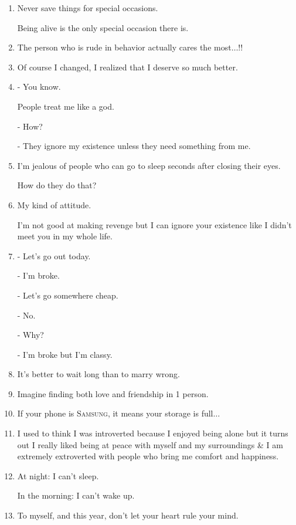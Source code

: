 \documentclass{article}
\numberwithin{equation}{section}
\begin{document}
\begin{enumerate}
    \textbf{Inner peace} is the new success.
    
    \textbf{Health} is the new wealth.
    
    \textbf{Kindness} is the new cool.
    \item Never save things for special occasions.
    
    Being alive is the only special occasion there is.
    \item The person who is rude in behavior actually cares the most$\ldots$!!
    \item Of course I changed, I realized that I deserve so much better.
    \item - You know.
    
    People treat me like a god.
    
    - How?
    
    - They ignore my existence unless they need something from me.
    \item I'm jealous of people who can go to sleep seconds after closing their eyes.
    
    How do they do that?
    \item My kind of attitude.
    
    I'm not good at making revenge but I can ignore your existence like I didn't meet you in my whole life.
    \item - Let's go out today.
    
    - I'm broke.
    
    - Let's go somewhere cheap.
    
    - No.
    
    - Why?
    
    - I'm broke but I'm classy.
    \item It's better to wait long than to marry wrong.
    \item Imagine finding both love and friendship in 1 person.
    \item If your phone is \textsc{Samsung}, it means your storage is full$\ldots$
    \item I used to think I was introverted because I enjoyed being alone but it turns out I really liked being at peace with myself and my surroundings \& I am extremely extroverted with people who bring me comfort and happiness.
    \item At night: I can't sleep.
    
    In the morning: I can't wake up.
    \item To myself, and this year, don't let your heart rule your mind.
    

\end{enumerate}
\end{document}
